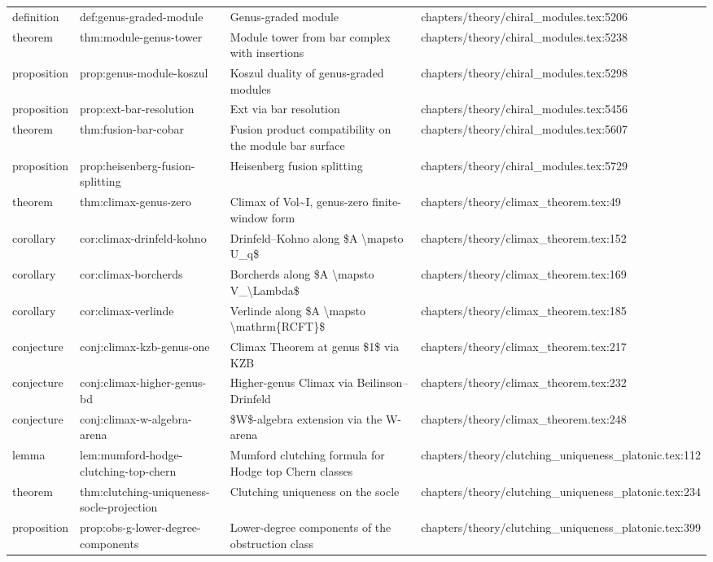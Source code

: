 \documentclass[11pt]{article}
\begin{document}
\begin{longtable}{L{0.10\textwidth}L{0.26\textwidth}L{0.42\textwidth}L{0.22\textwidth}}
definition & def:genus-graded-module & Genus-graded module & chapters/theory/chiral\_modules.tex:5206\\
theorem & thm:module-genus-tower & Module tower from bar complex with insertions & chapters/theory/chiral\_modules.tex:5238\\
proposition & prop:genus-module-koszul & Koszul duality of genus-graded modules & chapters/theory/chiral\_modules.tex:5298\\
proposition & prop:ext-bar-resolution & Ext via bar resolution & chapters/theory/chiral\_modules.tex:5456\\
theorem & thm:fusion-bar-cobar & Fusion product compatibility on the module bar surface & chapters/theory/chiral\_modules.tex:5607\\
proposition & prop:heisenberg-fusion-splitting & Heisenberg fusion splitting & chapters/theory/chiral\_modules.tex:5729\\
theorem & thm:climax-genus-zero & Climax of Vol\textasciitilde{}I, genus-zero finite-window form & chapters/theory/climax\_theorem.tex:49\\
corollary & cor:climax-drinfeld-kohno & Drinfeld--Kohno along \$A \textbackslash{}mapsto U\_q\$ & chapters/theory/climax\_theorem.tex:152\\
corollary & cor:climax-borcherds & Borcherds along \$A \textbackslash{}mapsto V\_\textbackslash{}Lambda\$ & chapters/theory/climax\_theorem.tex:169\\
corollary & cor:climax-verlinde & Verlinde along \$A \textbackslash{}mapsto \textbackslash{}mathrm\{RCFT\}\$ & chapters/theory/climax\_theorem.tex:185\\
conjecture & conj:climax-kzb-genus-one & Climax Theorem at genus \$1\$ via KZB & chapters/theory/climax\_theorem.tex:217\\
conjecture & conj:climax-higher-genus-bd & Higher-genus Climax via Beilinson--Drinfeld & chapters/theory/climax\_theorem.tex:232\\
conjecture & conj:climax-w-algebra-arena & \$W\$-algebra extension via the W-arena & chapters/theory/climax\_theorem.tex:248\\
lemma & lem:mumford-hodge-clutching-top-chern & Mumford clutching formula for Hodge top Chern classes & chapters/theory/clutching\_uniqueness\_platonic.tex:112\\
theorem & thm:clutching-uniqueness-socle-projection & Clutching uniqueness on the socle & chapters/theory/clutching\_uniqueness\_platonic.tex:234\\
proposition & prop:obs-g-lower-degree-components & Lower-degree components of the obstruction class & chapters/theory/clutching\_uniqueness\_platonic.tex:399\\

\end{longtable}
\end{document}
